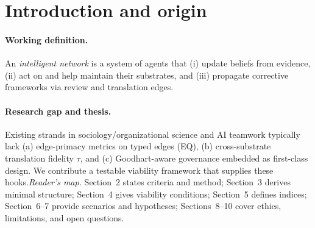 \documentclass[12pt]{article}
\begin{document}
\section{Introduction and origin}
\n\paragraph{Working definition.} An \emph{intelligent network} is a system of agents that (i) update beliefs from evidence, (ii) act on and help maintain their substrates, and (iii) propagate corrective frameworks via review and translation edges.\n\n\paragraph{Research gap and thesis.} Existing strands in sociology/organizational science and AI teamwork typically lack (a) edge-primacy metrics on typed edges (EQ), (b) cross-substrate translation fidelity $\tau$, and (c) Goodhart-aware governance embedded as first-class design. We contribute a testable viability framework that supplies these hooks.\n\n\emph{Reader's map.} Section~2 states criteria and method; Section~3 derives minimal structure; Section~4 gives viability conditions; Section~5 defines indices; Section~6–7 provide scenarios and hypotheses; Sections~8–10 cover ethics, limitations, and open questions.\n
\end{document}
